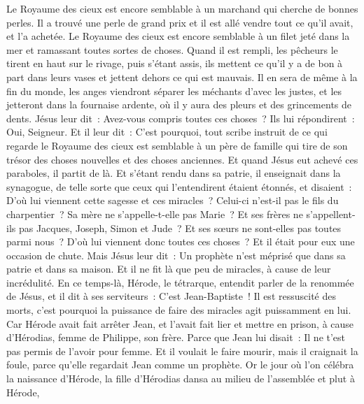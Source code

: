 \begin{multicols}{2}
Le Royaume des cieux est encore semblable à un marchand qui cherche de bonnes perles.
Il a trouvé une perle de grand prix et il est allé vendre tout ce qu'il avait, et l'a achetée.
Le Royaume des cieux est encore semblable à un filet jeté dans la mer et ramassant toutes sortes de choses.
Quand il est rempli, les pêcheurs le tirent en haut sur le rivage, puis s'étant assis, ils mettent ce qu'il y a de bon à part dans leurs vases et jettent dehors ce qui est mauvais.
Il en sera de même à la fin du monde, les anges viendront séparer les méchants d'avec les justes,
et les jetteront dans la fournaise ardente, où il y aura des pleurs et des grincements de dents.
Jésus leur dit~: Avez-vous compris toutes ces choses~? Ils lui répondirent~: Oui, Seigneur.
Et il leur dit~: C'est pourquoi, tout scribe instruit de ce qui regarde le Royaume des cieux est semblable à un père de famille qui tire de son trésor des choses nouvelles et des choses anciennes.
Et quand Jésus eut achevé ces paraboles, il partit de là.
Et s'étant rendu dans sa patrie, il enseignait dans la synagogue, de telle sorte que ceux qui l'entendirent étaient étonnés, et disaient~: D'où lui viennent cette sagesse et ces miracles~?
Celui-ci n'est-il pas le fils du charpentier~? Sa mère ne s'appelle-t-elle pas Marie~? Et ses frères ne s'appellent-ils pas Jacques, Joseph, Simon et Jude~?
Et ses sœurs ne sont-elles pas toutes parmi nous~? D'où lui viennent donc toutes ces choses~?
Et il était pour eux une occasion de chute. Mais Jésus leur dit~: Un prophète n'est méprisé que dans sa patrie et dans sa maison.
Et il ne fit là que peu de miracles, à cause de leur incrédulité.
\VerseOne{}En ce temps-là, Hérode, le tétrarque, entendit parler de la renommée de Jésus, et il dit à ses serviteurs~: C'est Jean-Baptiste~!
Il est ressuscité des morts, c'est pourquoi la puissance de faire des miracles agit puissamment en lui.
Car Hérode avait fait arrêter Jean, et l'avait fait lier et mettre en prison, à cause d'Hérodias, femme de Philippe, son frère.
Parce que Jean lui disait~: Il ne t'est pas permis de l'avoir pour femme.
Et il voulait le faire mourir, mais il craignait la foule, parce qu'elle regardait Jean comme un prophète.
Or le jour où l'on célébra la naissance d'Hérode, la fille d'Hérodias dansa au milieu de l'assemblée et plut à Hérode,

\end{multicols}

